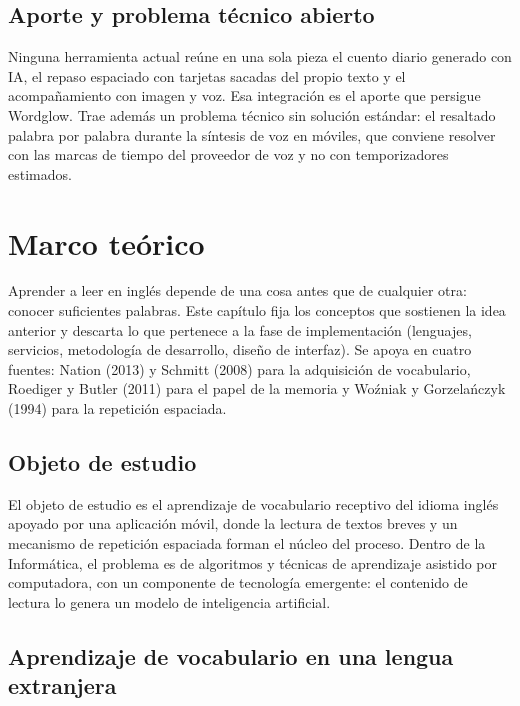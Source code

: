 \documentclass[letterpaper]{wordglow}
\begin{document}
\subsection{Aporte y problema t\'ecnico abierto}

Ninguna herramienta actual re\'une en una sola pieza el cuento diario
generado con IA, el repaso espaciado con tarjetas sacadas del propio
texto y el acompa\~namiento con imagen y voz. Esa integraci\'on es el aporte
que persigue Wordglow. Trae adem\'as un problema t\'ecnico sin soluci\'on
est\'andar: el resaltado palabra por palabra durante la s\'intesis de voz en
m\'oviles, que conviene resolver con las marcas de tiempo del proveedor de
voz y no con temporizadores estimados.

\clearpage
{}
\section{Marco te\'orico}

Aprender a leer en ingl\'es depende de una cosa antes que de cualquier
otra: conocer suficientes palabras. Este cap\'itulo fija los conceptos que
sostienen la idea anterior y descarta lo que pertenece a la fase de
implementaci\'on (lenguajes, servicios, metodolog\'ia de desarrollo, dise\~no
de interfaz). Se apoya en cuatro fuentes: Nation (2013) y Schmitt (2008)
para la adquisici\'on de vocabulario, Roediger y Butler (2011) para el
papel de la memoria y Wo\'zniak y Gorzela\'nczyk (1994) para la repetici\'on
espaciada.

\subsection{Objeto de estudio}

El objeto de estudio es el aprendizaje de vocabulario receptivo del
idioma ingl\'es apoyado por una aplicaci\'on m\'ovil, donde la lectura de
textos breves y un mecanismo de repetici\'on espaciada forman el n\'ucleo
del proceso. Dentro de la Inform\'atica, el problema es de algoritmos y
t\'ecnicas de aprendizaje asistido por computadora, con un componente de
tecnolog\'ia emergente: el contenido de lectura lo genera un modelo de
inteligencia artificial.

\subsection{Aprendizaje de vocabulario en una lengua extranjera}
\end{document}
